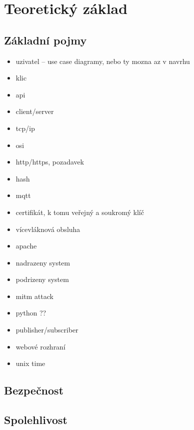 \chapter{Teoretický základ}
\label{sec:te}

\section{Základní pojmy}

\begin{itemize}
    \item uzivatel -- use case diagramy, nebo ty mozna az v navrhu
    \item klic
    \item api
    \item client/server
    \item tcp/ip
    \item osi
    \item http/https, pozadavek
    \item hash
    \item mqtt
    \item certifikát, k tomu veřejný a soukromý klíč
    \item vícevláknová obsluha
    \item apache
    \item nadrazeny system
    \item podrizeny system
    \item mitm attack
    \item python ??
    \item publisher/subscriber
    \item webové rozhraní
    \item unix time
\end{itemize}

\section{Bezpečnost}

\section{Spolehlivost}